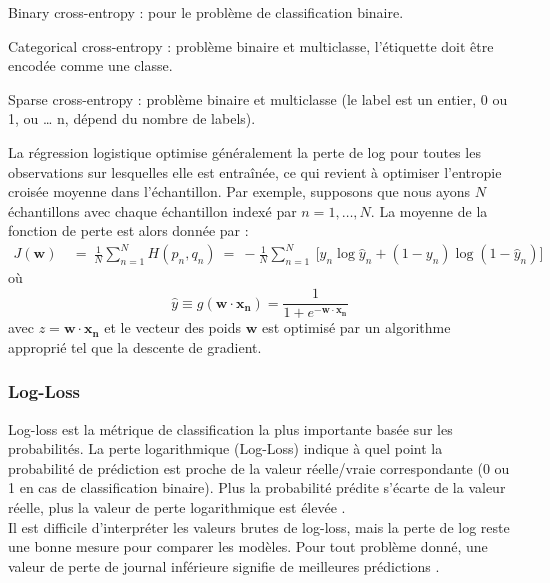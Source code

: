 		\begin{list}{--}{Types d'entropie croisée :}
			\item Binary cross-entropy : pour le problème de classification binaire.
			\item Categorical cross-entropy : problème binaire et multiclasse, l'étiquette doit être encodée comme une classe.
			\item Sparse cross-entropy : problème binaire et multiclasse (le label est un entier, 0 ou 1, ou … n, dépend du nombre de labels).
		\end{list}
		La régression logistique optimise généralement la perte de log pour toutes les observations sur lesquelles elle est entraînée, ce qui revient à optimiser l'entropie croisée moyenne dans l'échantillon. Par exemple, supposons que nous ayons ${\displaystyle N}$ échantillons avec chaque échantillon indexé par ${\displaystyle n=1,\dots ,N}$. La moyenne de la fonction de perte est alors donnée par :
		\begin{equation*}
			{\displaystyle {
				\begin{aligned}
					J(\mathbf {w} )\ &=\ {\frac {1}{N}}\sum _{n=1}^{N}H(p_{n},q_{n})\ =\ -{\frac {1}{N}}\sum _{n=1}^{N}\ {\bigg [}y_{n}\log {\hat {y}}_{n}+(1-y_{n})\log(1-{\hat {y}}_{n}){\bigg ]}\,
				\end{aligned}}}
		\end{equation*}
		où
		\begin{equation*}
			{\displaystyle{\hat {y}}\equiv g(\mathbf {w} \cdot \mathbf {x_n} )={\frac {1}{1+e^{-\mathbf {w} \cdot \mathbf {x_n} }}}}
		\end{equation*}
		avec  $ z = \mathbf {w} \cdot \mathbf {x_n} $ et le vecteur des poids ${\mathbf {w} }$ est optimisé par un algorithme approprié tel que la descente de gradient.
			
		\subsubsection{\textbf{Log-Loss}}
		Log-loss est la métrique de classification la plus importante basée sur les probabilités.
		La perte logarithmique (Log-Loss) indique à quel point la probabilité de prédiction est proche de la valeur réelle/vraie correspondante (0 ou 1 en cas de classification binaire). Plus la probabilité prédite s'écarte de la valeur réelle, plus la valeur de perte logarithmique est élevée \cite{geron2017hands}.\\
		Il est difficile d'interpréter les valeurs brutes de  log-loss, mais la perte de log reste une bonne mesure pour comparer les modèles. Pour tout problème donné, une valeur de perte de journal inférieure signifie de meilleures prédictions \cite{bosman2020visualising}.
		
